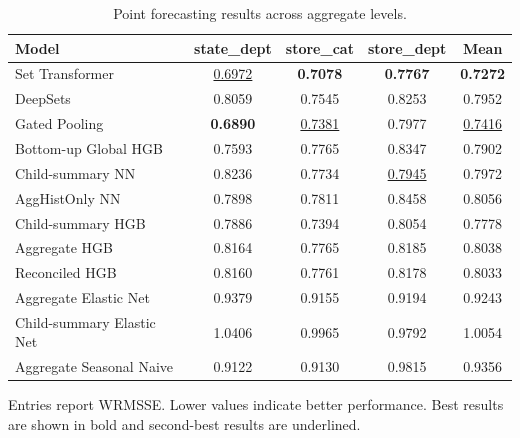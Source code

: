 \begin{table}[H]
\centering
\caption{Point forecasting results across aggregate levels.}
\label{tab:main_point}
\begin{threeparttable}
\begin{tabular}{lcccc}
\toprule
Model & state\_dept & store\_cat & store\_dept & Mean \\
\midrule
Set Transformer & \underline{0.6972} & \textbf{0.7078} & \textbf{0.7767} & \textbf{0.7272} \\
DeepSets & 0.8059 & 0.7545 & 0.8253 & 0.7952 \\
Gated Pooling & \textbf{0.6890} & \underline{0.7381} & 0.7977 & \underline{0.7416} \\
Bottom-up Global HGB & 0.7593 & 0.7765 & 0.8347 & 0.7902 \\
Child-summary NN & 0.8236 & 0.7734 & \underline{0.7945} & 0.7972 \\
AggHistOnly NN & 0.7898 & 0.7811 & 0.8458 & 0.8056 \\
Child-summary HGB & 0.7886 & 0.7394 & 0.8054 & 0.7778 \\
Aggregate HGB & 0.8164 & 0.7765 & 0.8185 & 0.8038 \\
Reconciled HGB & 0.8160 & 0.7761 & 0.8178 & 0.8033 \\
Aggregate Elastic Net & 0.9379 & 0.9155 & 0.9194 & 0.9243 \\
Child-summary Elastic Net & 1.0406 & 0.9965 & 0.9792 & 1.0054 \\
Aggregate Seasonal Naive & 0.9122 & 0.9130 & 0.9815 & 0.9356 \\
\bottomrule
\end{tabular}
\begin{tablenotes}
\footnotesize \item Entries report WRMSSE. Lower values indicate better performance. Best results are shown in bold and second-best results are underlined.
\end{tablenotes}
\end{threeparttable}
\end{table}
